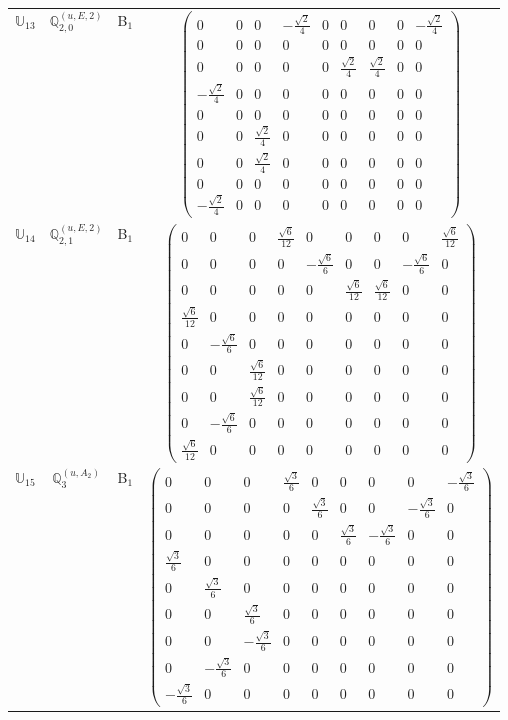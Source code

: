 \documentclass[fleqn,10pt,landscape]{article}
\begin{document}
\begin{itemize}
\begin{center}
\begin{longtable}{c|c|c|c}
$ \mathbb{U}_{13} $ & $\mathbb{Q}_{2,0}^{(u,E,2)}$ & B$_{1}$ & $\begin{pmatrix} 0 & 0 & 0 & - \frac{\sqrt{2}}{4} & 0 & 0 & 0 & 0 & - \frac{\sqrt{2}}{4} \\ 0 & 0 & 0 & 0 & 0 & 0 & 0 & 0 & 0 \\ 0 & 0 & 0 & 0 & 0 & \frac{\sqrt{2}}{4} & \frac{\sqrt{2}}{4} & 0 & 0 \\ - \frac{\sqrt{2}}{4} & 0 & 0 & 0 & 0 & 0 & 0 & 0 & 0 \\ 0 & 0 & 0 & 0 & 0 & 0 & 0 & 0 & 0 \\ 0 & 0 & \frac{\sqrt{2}}{4} & 0 & 0 & 0 & 0 & 0 & 0 \\ 0 & 0 & \frac{\sqrt{2}}{4} & 0 & 0 & 0 & 0 & 0 & 0 \\ 0 & 0 & 0 & 0 & 0 & 0 & 0 & 0 & 0 \\ - \frac{\sqrt{2}}{4} & 0 & 0 & 0 & 0 & 0 & 0 & 0 & 0 \end{pmatrix}$ \\
$ \mathbb{U}_{14} $ & $\mathbb{Q}_{2,1}^{(u,E,2)}$ & B$_{1}$ & $\begin{pmatrix} 0 & 0 & 0 & \frac{\sqrt{6}}{12} & 0 & 0 & 0 & 0 & \frac{\sqrt{6}}{12} \\ 0 & 0 & 0 & 0 & - \frac{\sqrt{6}}{6} & 0 & 0 & - \frac{\sqrt{6}}{6} & 0 \\ 0 & 0 & 0 & 0 & 0 & \frac{\sqrt{6}}{12} & \frac{\sqrt{6}}{12} & 0 & 0 \\ \frac{\sqrt{6}}{12} & 0 & 0 & 0 & 0 & 0 & 0 & 0 & 0 \\ 0 & - \frac{\sqrt{6}}{6} & 0 & 0 & 0 & 0 & 0 & 0 & 0 \\ 0 & 0 & \frac{\sqrt{6}}{12} & 0 & 0 & 0 & 0 & 0 & 0 \\ 0 & 0 & \frac{\sqrt{6}}{12} & 0 & 0 & 0 & 0 & 0 & 0 \\ 0 & - \frac{\sqrt{6}}{6} & 0 & 0 & 0 & 0 & 0 & 0 & 0 \\ \frac{\sqrt{6}}{12} & 0 & 0 & 0 & 0 & 0 & 0 & 0 & 0 \end{pmatrix}$ \\
$ \mathbb{U}_{15} $ & $\mathbb{Q}_{3}^{(u,A_{2})}$ & B$_{1}$ & $\begin{pmatrix} 0 & 0 & 0 & \frac{\sqrt{3}}{6} & 0 & 0 & 0 & 0 & - \frac{\sqrt{3}}{6} \\ 0 & 0 & 0 & 0 & \frac{\sqrt{3}}{6} & 0 & 0 & - \frac{\sqrt{3}}{6} & 0 \\ 0 & 0 & 0 & 0 & 0 & \frac{\sqrt{3}}{6} & - \frac{\sqrt{3}}{6} & 0 & 0 \\ \frac{\sqrt{3}}{6} & 0 & 0 & 0 & 0 & 0 & 0 & 0 & 0 \\ 0 & \frac{\sqrt{3}}{6} & 0 & 0 & 0 & 0 & 0 & 0 & 0 \\ 0 & 0 & \frac{\sqrt{3}}{6} & 0 & 0 & 0 & 0 & 0 & 0 \\ 0 & 0 & - \frac{\sqrt{3}}{6} & 0 & 0 & 0 & 0 & 0 & 0 \\ 0 & - \frac{\sqrt{3}}{6} & 0 & 0 & 0 & 0 & 0 & 0 & 0 \\ - \frac{\sqrt{3}}{6} & 0 & 0 & 0 & 0 & 0 & 0 & 0 & 0 \end{pmatrix}$ \\

\end{longtable}
\end{center}
\end{itemize}
\end{document}
